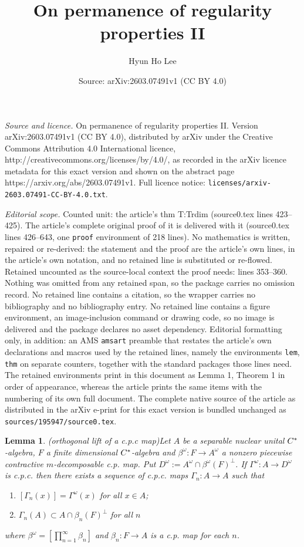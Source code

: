 \documentclass[10pt,a4paper]{amsart}
\title{On permanence of regularity properties II}
\author{Hyun Ho Lee}
\date{Source: arXiv:2603.07491v1 (CC BY 4.0)}
\newtheorem{lem}{Lemma}
\begin{document}
\maketitle

\noindent\emph{Source and licence.} On permanence of regularity properties II. Version arXiv:2603.07491v1 (CC BY 4.0), distributed by arXiv under the Creative Commons Attribution 4.0 International licence, http://creativecommons.org/licenses/by/4.0/, as recorded in the arXiv licence metadata for this exact version and shown on the abstract page https://arxiv.org/abs/2603.07491v1. Full licence notice: \texttt{licenses/arxiv-2603.07491-CC-BY-4.0.txt}.\par\smallskip

\noindent\textit{Editorial scope.} Counted unit: the article's thm T:Trdim (source0.tex lines 423--425). The article's complete original proof of it is delivered with it (source0.tex lines 426--643, one \texttt{proof} environment of 218 lines). No mathematics is written, repaired or re-derived: the statement and the proof are the article's own lines, in the article's own notation, and no retained line is substituted or re-flowed.  Retained uncounted as the source-local context the proof needs: lines 353--360.  Nothing was omitted from any retained span, so the package carries no omission record.  No retained line contains a citation, so the wrapper carries no bibliography and no bibliography entry.  No retained line contains a figure environment, an image-inclusion command or drawing code, so no image is delivered and the package declares no asset dependency.  Editorial formatting only, in addition: an AMS \texttt{amsart} preamble that restates the article's own declarations and macros used by the retained lines, namely the environments \texttt{lem}, \texttt{thm} on separate counters, together with the standard packages those lines need.  The retained environments print in this document as Lemma 1, Theorem 1 in order of appearance, whereas the article prints the same items with the numbering of its own full document.  The complete native source of the article as distributed in the arXiv e-print for this exact version is bundled unchanged as \texttt{sources/195947/source0.tex}.
\begin{lem}(orthogonal lift of a c.p.c map)\label{L:orthogonallift}
Let $A$ be a separable nuclear unital $C\sp*$-algebra, $F$ a finite dimensional $C\sp*$-algebra and $\beta^{\omega}: F \to A^{\omega}$ a nonzero piecewise contractive  $m$-decomposable c.p. map. Put $D^{\omega}:=A^{\omega}\cap \beta^{\omega}(F)^{\perp}$. If $\Gamma^{\omega}: A \to D^{\omega}$ is c.p.c. then there exists a sequence of c.p.c. maps $\Gamma_n: A \to A$ such that 
\begin{enumerate}
\item $ [\Gamma_n(x)]=\Gamma^{\omega}(x)$ for all $x\in A$;
\item $ \Gamma_n(A) \subset A\cap \beta_n(F)^{\perp}$ for all $n$  
\end{enumerate}   
where $\beta^{\omega}=[\prod_{n=1}^{\infty} \beta_n]$ and $\beta_n: F \to A$ is a c.p. map  for each $n$. 
\end{lem}
\end{document}
